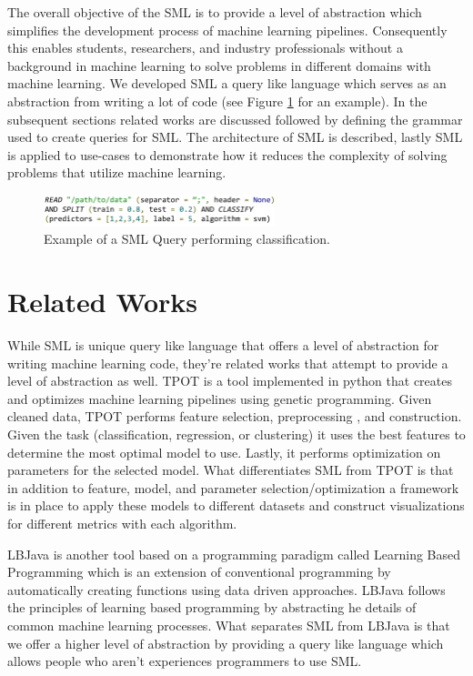 \documentclass[jair,twoside,11pt,theapa]{article}
\begin{document}
The overall objective of the SML is to provide a level of abstraction which simplifies the development process of machine learning pipelines. Consequently this enables students, researchers, and industry professionals without a background in machine learning to solve problems in different domains with machine learning. We developed SML a query like language which serves as an abstraction from writing a lot of code (see Figure \ref{fig:sml-ex-1} for an example). In the subsequent sections related works are discussed followed by defining the grammar used to create queries for SML. The architecture of SML is described, lastly SML is applied to use-cases to demonstrate how it reduces the complexity of solving problems that utilize machine learning.

\begin{figure}
\includegraphics[width=0.6\textwidth]{figs/sml-ex-1.png}
\centering
\caption{Example of a SML Query performing classification.}
\label{fig:sml-ex-1}
\end{figure}

\section{Related Works}
\label{RelatedWorks}

While SML is unique query like language that offers a level of abstraction for writing machine learning code, they're related works that attempt to provide a level of abstraction as well. TPOT \cite{TPOT} is a tool implemented in python that creates and optimizes machine learning pipelines using genetic programming. Given cleaned data, TPOT performs feature selection, preprocessing , and construction. Given the task (classification, regression, or clustering) it uses the best features to determine the most optimal model to use. Lastly, it performs optimization on parameters for the selected model. What differentiates SML from TPOT is that in addition to feature, model, and parameter selection/optimization a framework is in place to apply these models to different datasets and construct visualizations for different metrics with each algorithm.

LBJava \cite{RizzoloRo10} is another tool  based on a programming paradigm called Learning Based Programming \cite{Roth05} which is an extension of conventional programming by automatically creating functions using data driven approaches. LBJava follows the principles of learning based programming by abstracting he details of common machine learning processes. What separates SML from LBJava is that we offer a higher level of abstraction by providing a query like language which allows people who aren't experiences programmers to use SML.
\end{document}
